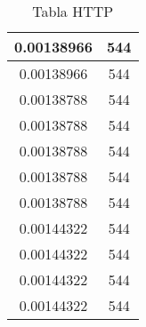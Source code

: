 \begin{table}[]
\begin{tabular}[scale=0.5]{|c|c|}
		0.00138966                 & 544                   \\ \hline
		0.00138966                 & 544                   \\ \hline
		0.00138788                 & 544                   \\ \hline
		0.00138788                 & 544                   \\ \hline
		0.00138788                 & 544                   \\ \hline
		0.00138788                 & 544                   \\ \hline
		0.00138788                 & 544                   \\ \hline
		0.00144322                 & 544                   \\ \hline
		0.00144322                 & 544                   \\ \hline
		0.00144322                 & 544                   \\ \hline
		0.00144322                 & 544                   \\ \hline

	
	\end{tabular}
	\caption{Tabla HTTP} \label{http_tabla}
\end{table}

